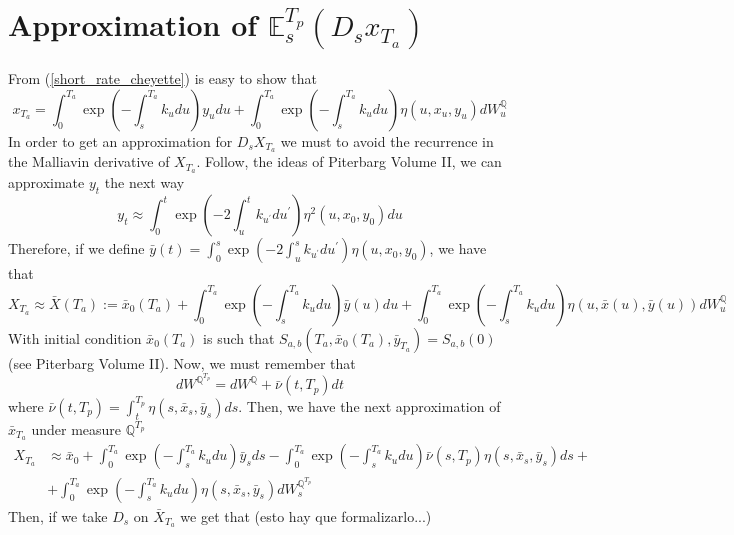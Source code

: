 \documentclass[a4paper,10pt]{article}
\newcommand{\1}{\mathbf{1}}
\begin{document}
\section{Approximation of $\mathbb{E}_s^{T_p}\left(D_s x_{T_a}\right)$}
\label{expected_forward_measure_malliavin_derivative_x_t}
From (\ref{short_rate_cheyette}) is easy to show that
\begin{equation*}
x_{T_a} = \int_{0}^{T_a} \exp\left(-\int_{s}^{T_a}k_u du\right) y_u du + \int_{0}^{T_a}  \exp\left(-\int_{s}^{T_a}k_u du \right) \eta(u,x_u,y_u) dW_u^{\mathbb{Q}}  
\end{equation*}
In order to get an approximation for $D_sX_{T_a}$ we must to avoid the recurrence in the Malliavin derivative of $X_{T_a}$. Follow, the ideas of Piterbarg Volume II, we can approximate $y_t$ the next way
\begin{equation*}
y_t \approx \int_{0}^{t} \exp\left(-2\int_{u}^{t} k_{u^{\prime}} du^{\prime} \right) \eta^{2}(u,x_0,y_0) du
\end{equation*}
Therefore, if we define $\bar{y}(t)= \int_{0}^{s} \exp\left(-2\int_{u}^{s} k_{u^{\prime}} du^{\prime} \right) \eta(u,x_0,y_0)$, we have that
\begin{equation}\label{approximation_x_t_a}
X_{T_a} \approx \bar{X}(T_a):= \bar{x}_0(T_a)  + \int_{0}^{T_a} \exp\left(-\int_{s}^{T_a}k_u du\right) \bar{y}(u) du + \int_{0}^{T_a}  \exp\left(-\int_{s}^{T_a}k_u du \right) \eta(u,\bar{x}(u),\bar{y}(u)) dW_u^{\mathbb{Q}}  
\end{equation}
With initial condition  $\bar{x}_{0}(T_a)$ is such that $S_{a,b}(T_a,\bar{x}_0(T_a), \bar{y}_{T_a}) = S_{a,b}(0)$ (see Piterbarg Volume II). Now, we must remember that 
\begin{equation*}
dW^{\mathbb{Q}^{T_p}} = dW^{\mathbb{Q}} + \bar{\nu}(t,T_p) dt 
\end{equation*}
where $\bar{\nu}(t,T_p) = \int_{t}^{T_p} \eta(s,\bar{x}_s,\bar{y}_s) ds $. Then, we have the next approximation of $\bar{x}_{T_a}$ under measure $\mathbb{Q}^{T_p}$
\begin{align*}
X_{T_a} &\approx \bar{x}_0  + \int_{0}^{T_a} \exp\left(-\int_{s}^{T_a}k_u du\right) \bar{y}_s ds - \int_{0}^{T_a} \exp\left(-\int_{s}^{T_a}k_u du\right) \bar{\nu}(s, T_p) \eta(s,\bar{x}_s,\bar{y}_s) ds +  \\
&+ \int_{0}^{T_a}  \exp\left(-\int_{s}^{T_a}k_u du \right)\eta(s,\bar{x}_s,\bar{y}_s) dW_s^{\mathbb{Q}^{T_p}}  
\end{align*} 
Then, if we take $D_s$ on $\bar{X}_{T_a}$ we get that (esto hay que formalizarlo...)
\end{document}
